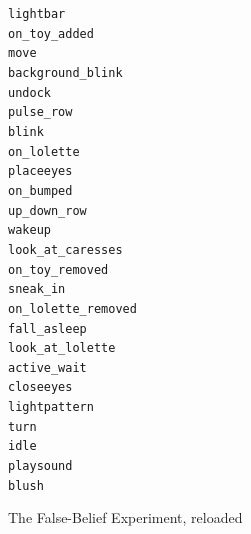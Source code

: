 \documentclass[compress]{beamer}
\begin{document}
{{\begin{frame}{}
    \begin{multicols}{3}
\scriptsize
{\tt lightbar} \\
{\tt on\_toy\_added} \\
{\tt move} \\
{\tt background\_blink} \\
{\tt undock} \\
{\tt pulse\_row} \\
{\tt blink} \\
{\tt on\_lolette} \\
{\tt placeeyes} \\
{\tt on\_bumped} \\
{\tt up\_down\_row} \\
{\tt wakeup} \\
{\tt look\_at\_caresses} \\
{\tt on\_toy\_removed} \\
{\tt sneak\_in} \\
{\tt on\_lolette\_removed} \\
{\tt fall\_asleep} \\
{\tt look\_at\_lolette} \\
{\tt active\_wait} \\
{\tt closeeyes} \\
{\tt lightpattern} \\
{\tt turn} \\
{\tt idle} \\
{\tt playsound} \\
{\tt blush}

    \end{multicols}
\end{frame}
}




{
\begin{frame}{The False-Belief Experiment, reloaded}
    \centering

\end{frame}}}
\end{document}

